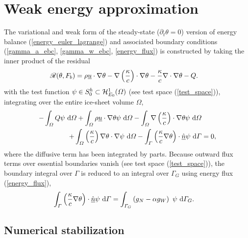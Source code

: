 
\section{Weak energy approximation}

The variational and weak form of the steady-state ($\partial_t \theta = 0$) version of  energy balance (\ref{energy_euler_lagrange}) and associated boundary conditions (\ref{gamma_a_ebc}, \ref{gamma_w_ebc}, \ref{energy_flux}) is constructed by taking the inner product of the residual 
\begin{align}
  \label{energy_forward_model}
  \mathscr{R}(\theta, F_b) &= \rho \underline{u} \cdot \nabla \theta - \nabla \left( \frac{\kappa}{c} \right) \cdot \nabla \theta - \frac{\kappa}{c} \nabla \cdot \nabla \theta - Q.
\end{align}
with the test function $\psi \in S_0^h \subset \mathcal{H}_{E_0}^1(\varOmega)$ (see test space (\ref{test_space})), integrating over the entire ice-sheet volume $\Omega$,
\begin{align}
  - \int_{\varOmega} Q \psi \ \mathrm{d}\varOmega
  + \int_{\varOmega} \rho \underline{u} \cdot \nabla \theta \psi \ \mathrm{d}\varOmega 
  - \int_{\varOmega} \nabla \left( \frac{\kappa}{c} \right) \cdot \nabla \theta \psi \ \mathrm{d}\varOmega & \notag \\
  + \int_{\varOmega} \left( \frac{\kappa}{c} \right) \nabla \theta \cdot \nabla \psi \ \mathrm{d}\varOmega 
  \label{ie_intermediate_var_form}
  - \int_{\varGamma} \left( \frac{\kappa}{c} \nabla \theta \right) \cdot \underline{\hat{n}} \psi \ \mathrm{d}\varGamma &= 0,
\end{align}
where the diffusive term has been integrated by parts.  Because outward flux terms over essential boundaries vanish (see test space (\ref{test_space})), the boundary integral over $\Gamma$ is reduced to an integral over $\Gamma_G$ using energy flux (\ref{energy_flux}),
\begin{align}
  \label{energy_basal_boundary_form}
  \int_{\varGamma} \left( \frac{\kappa}{c} \nabla \theta \right) \cdot \underline{\hat{n}} \psi \ \mathrm{d}\varGamma &= \int_{\varGamma_G} \left( g_N - \alpha g_W \right)\ \psi \ \mathrm{d}\varGamma_G.
\end{align}


\subsection{Numerical stabilization}

